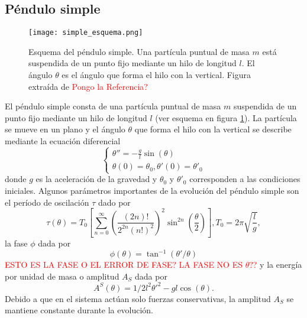 \documentclass[aps,prb,twocolumn,superscriptaddress,floatfix,longbibliography]{revtex4-2}
\newif\ifptitle
\newif\ifpnumber
\newcounter{para}
\newcommand\ptitle[1]{\par\refstepcounter{para}
{\ifpnumber{\noindent\textcolor{lightgray}{\textbf{\thepara}}\indent}\fi}
{\ifptitle{\textbf{[{#1}]}}\fi}}
\begin{document}
\subsection{Péndulo simple}

\ptitle{Presentar ecuaciones de la dinámica}

\begin{figure}[h]
  \texttt{[image: simple\_esquema.png]}
  \caption{Esquema del péndulo simple. Una partícula puntual de masa $m$ está suspendida de un punto fijo mediante un hilo de longitud $l$. El ángulo $\theta$ es el ángulo que forma el hilo con la vertical. Figura extraída de \textcolor{red}{Pongo la Referencia?}}
   \label{fig:simple_esquema}
\end{figure}

El péndulo simple consta de una partícula puntual de masa $m$ suspendida de un punto fijo mediante un hilo de longitud $l$ (ver esquema en figura \ref{fig:simple_esquema}). La partícula se mueve en un plano y el ángulo $\theta$ que forma el hilo con la vertical se describe mediante la ecuación diferencial
\begin{equation}
  \left\{\begin{matrix}
    \theta'' = -\frac{g}{l} \sin{(\theta)} \\
    \theta(0) = \theta_0, \theta'(0) = \theta'_0
   \end{matrix}\right.
  \label{eq:pendulo_simple}
\end{equation}
donde $g$ es la aceleración de la gravedad y $\theta_0$ y $\theta'_0$ corresponden a las condiciones iniciales. Algunos parámetros importantes de la evolución del péndulo simple son el período de oscilación $\tau$ dado por
\begin{equation}
  \tau(\theta) = T_0 \left [ \sum_{n = 0}^\infty \left(  \frac{(2n)!}{2^{2n}(n!)^2} \right )^2 \sin^{2n} \left ( \frac{\theta}{2} \right )   \right ], T_0 = 2 \pi \sqrt{\frac{l}{g}},
  \label{eq:periodo_simple}
\end{equation}
la fase $\phi$ dada por
\begin{equation}
  \phi(\theta) = \tan^{-1}(\theta'/\theta)
  \label{eq:fase_simple}
\end{equation}
\textcolor{red}{ESTO ES LA FASE O EL ERROR DE FASE? LA FASE NO ES $\theta$??} y la energía por unidad de masa o amplitud $A_S$ dada por
\begin{equation}
  A^S(\theta) = 1/2 l^2 \theta'^2 - g l \cos{(\theta)}.
  \label{eq:amplitud_simple}
\end{equation}
Debido a que en el sistema actúan solo fuerzas conservativas, la amplitud $A_S$ se mantiene constante durante la evolución.
\end{document}
